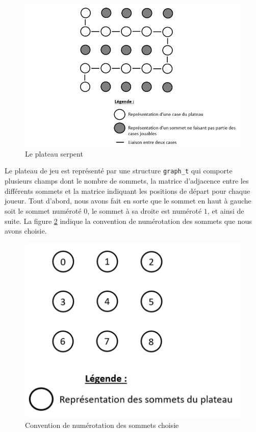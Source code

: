 \documentclass[11pt]{article}
\begin{document}
\begin{figure}[H]
    \centering
    \includegraphics[scale = 0.5]{plateau_serpent.png}
    \caption{Le plateau serpent}
    \label{fig:plateau_s}
\end{figure}

Le plateau de jeu est représenté par une structure \texttt{graph\_t} qui comporte plusieurs champs dont le nombre de sommets, la matrice d'adjacence entre les différents sommets et la matrice indiquant les positions de départ pour chaque joueur. Tout d'abord, nous avons fait en sorte que le sommet en haut à gauche soit le sommet numéroté $0$, le sommet à sa droite est numéroté $1$, et ainsi de suite. La figure \ref{fig:numerote} indique la convention de numérotation des sommets que nous avons choisie.

\begin{figure}[H]
    \centering
    \includegraphics[scale = 0.5]{sommet_plateau.png}
    \caption{Convention de numérotation des sommets choisie}
    \label{fig:numerote}
\end{figure}
\end{document}
